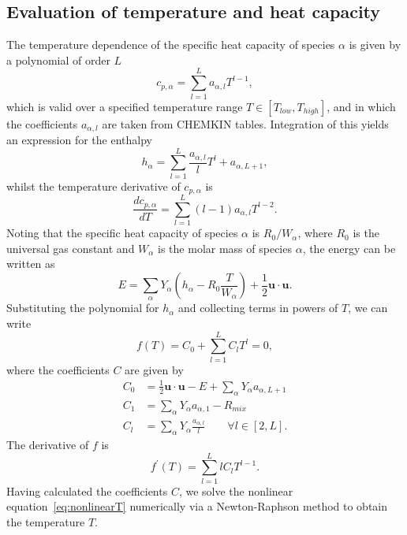\documentclass[notitlepage]{revtex4-1}
\begin{document}
\subsection{Evaluation of temperature and heat capacity}

The temperature dependence of the specific heat capacity of species $\alpha$ is given by a polynomial of order $L$
\begin{equation}c_{p,\alpha}=\displaystyle\sum_{l=1}^{L}a_{\alpha,l}T^{l-1},\end{equation}
which is valid over a specified temperature range $T\in\left[T_{low},T_{high}\right]$, and in which the coefficients $a_{\alpha,l}$ are taken from CHEMKIN tables. Integration of this yields an expression for the enthalpy
\begin{equation}h_{\alpha}=\displaystyle\sum_{l=1}^{L}\frac{a_{\alpha,l}}{l}T^{l} + a_{\alpha,L+1},\end{equation}
whilst the temperature derivative of $c_{p,\alpha}$ is
\begin{equation}\frac{dc_{p,\alpha}}{dT}=\displaystyle\sum_{l=1}^{L}\left(l-1\right)a_{\alpha,l}T^{l-2}.\end{equation}
Noting that the specific heat capacity of species $\alpha$ is $R_{0}/W_{\alpha}$, where $R_{0}$ is the universal gas constant and $W_{\alpha}$ is the molar mass of species $\alpha$, the energy can be written as
\begin{equation}E=\displaystyle\sum_{\alpha}Y_{\alpha}\left(h_{\alpha}-R_{0}\frac{T}{W_{\alpha}}\right)+\frac{1}{2}\bm{u}\cdot\bm{u}.\end{equation}
Substituting the polynomial for $h_{\alpha}$ and collecting terms in powers of $T$, we can write
\begin{equation}f\left(T\right)=C_{0}+\displaystyle\sum_{l=1}^{L}C_{l}T^{l}=0,\label{eq:nonlinearT}\end{equation}
where the coefficients $C$ are given by
\begin{subequations}\begin{align}
C_{0}&=\frac{1}{2}\bm{u}\cdot\bm{u}-E+\displaystyle\sum_{\alpha}Y_{\alpha}a_{\alpha,L+1}\\
C_{1}&=\displaystyle\sum_{\alpha}Y_{\alpha}a_{\alpha,1} - R_{mix}\\
C_{l}&=\displaystyle\sum_{\alpha}Y_{\alpha}\frac{a_{\alpha,l}}{l}\qquad\forall{l}\in\left[2,L\right].\end{align}\end{subequations}
The derivative of $f$ is
\begin{equation}f^{\prime}\left(T\right)=\displaystyle\sum_{l=1}^{L}lC_{l}T^{l-1}.\end{equation}
Having calculated the coefficients $C$, we solve the nonlinear equation~\eqref{eq:nonlinearT} numerically via a Newton-Raphson method to obtain the temperature $T$.
\end{document}
